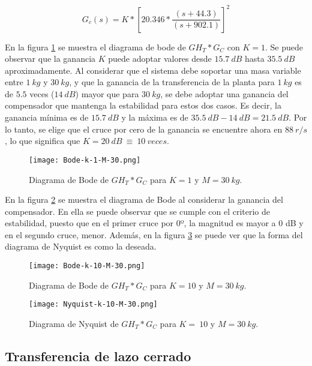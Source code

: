 \begin{equation}  
	G_c(s)=K*{[20.346*\frac{(s+44.3)}{(s+902.1)}]}^2
\end{equation} 

\noindent En la figura \ref{fig:bode-analog-compensado-para-k-1} se muestra el diagrama de bode de ${GH}_T*G_C$ con $K=1$. Se puede observar que la ganancia $K$ puede adoptar valores desde $15.7\:dB$ hasta $35.5\:dB$ aproximadamente. Al considerar que el sistema debe soportar una masa variable entre $1\:kg$ y $30\:kg$, y que la ganancia de la transferencia de la planta para $1\:kg$ es de $5.5$ veces ($14\:dB$) mayor que para $30\:kg$, se debe adoptar una ganancia del compensador que mantenga la estabilidad para estos dos casos. Es decir, la ganancia m\'{i}nima es de $15.7\:dB$ y la m\'{a}xima es de $35.5\:dB - 14\:dB = 21.5\:dB$. Por lo tanto, se elige que el cruce por cero de la ganancia se encuentre ahora en $88\:r/s$, lo que significa que $K=20\:dB\ \equiv \ 10\: veces$.


\begin{figure}[H]
	\centering
	\texttt{[image: Bode-k-1-M-30.png]}
	\caption{Diagrama de Bode de $GH_T*G_C$ para $K=1$ y $M=30\:kg$.}
	\label{fig:bode-analog-compensado-para-k-1}
\end{figure}

\noindent En la figura \ref{fig:bode-analog-compensado-para-k-10} se muestra el diagrama de Bode al considerar la ganancia del compensador. En ella se puede observar que se  cumple con el criterio de estabilidad, puesto que en el primer cruce por 0º, la magnitud es mayor a 0 dB y en el segundo cruce, menor. Adem\'{a}s, en la figura \ref{fig:nyquist-analog-para-k-10} se puede ver que la forma del diagrama de Nyquist es como la deseada.

\begin{figure}[H]
	\centering
	\texttt{[image: Bode-k-10-M-30.png]}
	\caption{Diagrama de Bode de $GH_{T}*G_C$ para $K=10$ y $M=30\:kg$.}
	\label{fig:bode-analog-compensado-para-k-10}
\end{figure}

\begin{figure}[H]
	\centering
	\texttt{[image: Nyquist-k-10-M-30.png]}
	\caption{Diagrama de Nyquist de $GH_T*G_C$ para $K=\:10$ y $M=30\:kg$.}
	\label{fig:nyquist-analog-para-k-10}
\end{figure}

\subsection{Transferencia de lazo cerrado}

